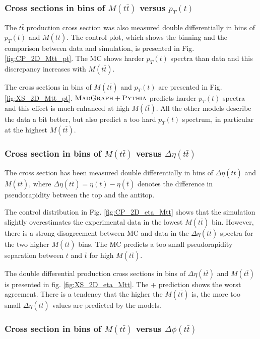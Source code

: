 
\subsubsection{Cross sections in bins of $M(t\bar{t})$ versus $p_{T}(t)$}

The $t\bar{t}$ production cross section was also measured double differentially in bins of $p_{T}(t)$ and $M(t\bar{t})$.
The control plot, which shows the binning and the comparison between data and simulation, is presented in Fig. \ref{fig:CP_2D_Mtt_pt}. 
The MC shows harder $p_{T}(t)$ spectra than data and this discrepancy increases with $M(t\bar{t})$.

The cross sections in bins of $M(t\bar{t})$ and $p_{T}(t)$ are presented in Fig. \ref{fig:XS_2D_Mtt_pt}. $\textsc{MadGraph}+\textsc{Pythia}$ predicts harder
$p_{T}(t)$ spectra and this effect is much enhanced at high $M(t\bar{t})$. All the other models describe the data a bit better, but 
also predict a too hard $p_{T}(t)$ spectrum, in particular at the highest $M(t\bar{t})$.

\subsubsection{Cross section in bins of $M(t\bar{t})$ versus $\Delta\eta(t\bar{t})$}

The cross section has been measured double differentially in bins of $\Delta\eta(t\bar{t})$ and $M(t\bar{t})$, where $\Delta\eta(t\bar{t}) = \eta(t) - \eta(\bar{t})$
denotes the difference in pseudorapidity between the top and the antitop.

The control distribution in Fig. \ref{fig:CP_2D_eta_Mtt} shows that the simulation slightly overestimates the experimental data in the lowest $M(t\bar{t})$
bin. However, there is a strong disagreement between MC and data in the $\Delta\eta(t\bar{t})$ spectra for the two higher $M(t\bar{t})$ bins. The MC predicts 
a too small pseudorapidity separation between $t$ and $\bar{t}$ for high $M(t\bar{t})$.

The double differential production cross sections in bins of $\Delta\eta(t\bar{t})$ and $M(t\bar{t})$ is presented in fig. \ref{fig:XS_2D_eta_Mtt}. The \MG + \PYTHIA
prediction shows the worst agreement. There is a tendency that the higher the $M(t\bar{t})$ is, the more too small $\Delta\eta(t\bar{t})$ values are predicted by
the models.

\subsubsection{Cross section in bins of $M(t\bar{t})$ versus $\Delta\phi(t\bar{t})$}

